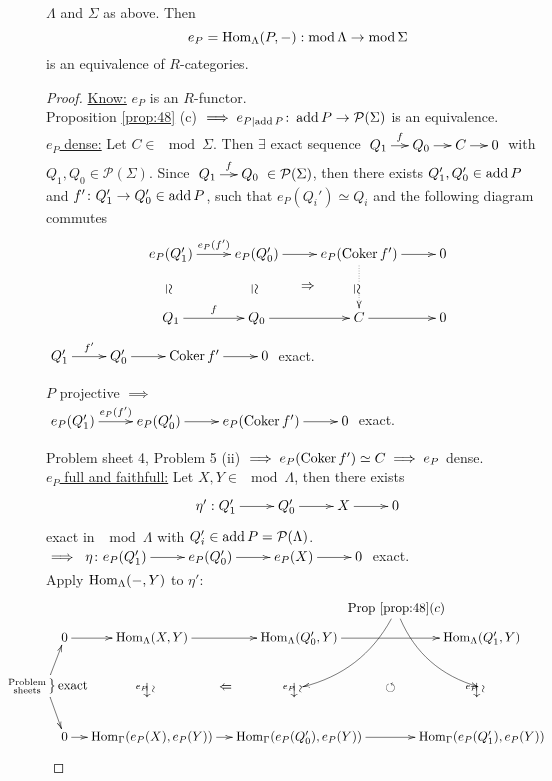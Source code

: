 \begin{prop}
\label{prop:49}
$\Lambda$ and $\Sigma$ as above. Then \[ e_P = \operatorname{Hom}_\Lambda(P,-):\operatorname{mod}\nolimits\Lambda \to \operatorname{mod}\nolimits\Sigma \] is an equivalence of $R$-categories.
\begin{proof}
\underline{Know:} $e_P$ is an $R$-functor.\\
Proposition \ref{prop:48} (c) $\implies e_{P\mid \operatorname{add} P}\colon \operatorname{add} P \to \mathcal{P}(\Sigma)$ is an equivalence.\\
\underline{$e_P$ dense:} Let $C \in \mod\Sigma$. Then $\exists$ exact
sequence $\xymatrix@C-1pc{Q_1 \ar[r]^f & Q_0 \ar[r] & C \ar[r] & 0}$
with $Q_1, Q_0 \in \mathcal{P}(\Sigma)$. Since $\xymatrix@C-1pc{Q_1
  \ar[r]^f & Q_0}\in \mathcal{P}(\Sigma)$, then there exists $Q_1',
Q_0' \in \operatorname{add} P$ and $f'\colon Q_1' \to Q_0' \in \operatorname{add} P$, such that
$e_P(Q_i') \simeq Q_i$ and the following diagram commutes 
\[\xymatrix@R-1pc{
e_P(Q_1') \ar[r]^{e_P(f')} \ar@{}[dd]|-*[@]{\simeq} & e_P(Q_0')
\ar@{}[dd]|-*[@]{\simeq} \ar[r] & e_P(\Coker f')
\ar@{.>}[dd]|-*[@]{\simeq} \ar[r] & 0\\ 
& \ar@{}[r]|-*[@]{\Rightarrow} &&\\
Q_1 \ar[r]^f & Q_0 \ar[r] & C \ar[r] & 0
}\]
$\xymatrix{Q_1' \ar[r]^{f'} & Q_0' \ar[r] & \Coker f' \ar[r] & 0}$ exact.

\begin{exer}
$P$ projective $\implies$\\
$\xymatrix{e_P(Q_1') \ar[r]^{e_P(f')} & e_P(Q_0') \ar[r] & e_P(\Coker f') \ar[r] & 0}$ exact.
\end{exer}

Problem sheet 4, Problem 5 (ii) $\implies e_P(\operatorname{Coker}\nolimits f') \simeq C \implies e_P$ dense.\\

\underline{$e_P$ full and faithfull:} Let $X, Y \in \mod\Lambda$, then
there exists 
\[\xymatrix{\eta':Q_1' \ar[r] & Q_0' \ar[r] & X \ar[r] & 0}\] 
exact in $\mod\Lambda$ with $Q_i' \in \operatorname{add} P = \mathcal{P}(\Lambda)$.\\ 
$\implies \xymatrix{\eta\colon e_P(Q_1') \ar[r] & e_P(Q_0') \ar[r] & e_P(X) \ar[r] & 0}$ exact.\\
Apply $\operatorname{Hom}_\Lambda(-,Y)$ to $\eta':$ 
\[\hspace*{-3pc} \xy
\xymatrix@C-1pc"dia"{
0 \ar[r] & \Hom_\Lambda(X,Y) \ar@{}[dd]|-*[@]{\xrightarrow{\sim}}_{e_P} \ar[r] & \Hom_\Lambda(Q_0',Y) \ar@{}[dd]|-*[@]{\xrightarrow{\sim}}_{e_P} \ar[rr] && \Hom_\Lambda(Q_1',Y) \ar@{}[dd]|-*[@]{\xrightarrow{\sim}}_{e_P}\\
&                \ar@{}[r]|-*[@]{\Leftarrow}  &                             &\circlearrowleft&\\
0 \ar[r] & \Hom_\G(e_P(X),e_P(Y)) \ar[r] & \Hom_\G(e_P(Q_0'),e_P(Y)) \ar[rr] && \Hom_\G(e_P(Q_1'),e_P(Y))
}
\POS(90, 8)
\xymatrix{\text{Prop } \ref{prop:48}(c) \ar@/^1pc/["dia"drr]\ar@/_1pc/["dia"drrrr]}
\POS(-5, -13)
\xymatrix{\left.{\begin{smallmatrix}\text{Problem}\\\text{sheets} \end{smallmatrix}}\right\rbrace \text{exact} \ar["dia"] \ar["dia"dd]}
\endxy\]


\end{proof}
\end{prop}
